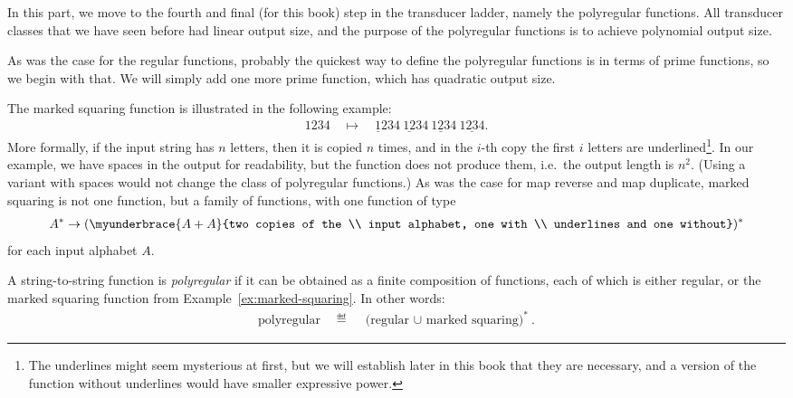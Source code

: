 In this part, we move to the fourth and final (for this book) step in the transducer ladder, namely the  polyregular functions. All transducer classes that we have seen before had linear output size, and the purpose of the polyregular functions is to achieve polynomial output size. 

As was the case for the regular functions, probably the quickest way to define the polyregular functions is in terms of prime functions, so we begin with that. We will simply add one more prime function, which has quadratic output size. 

\begin{myexample}\label{ex:marked-squaring}
    The marked squaring function is illustrated in the following example: 
    \begin{align*}
    1234 \quad \mapsto \quad \underline 1234 \ \underline{12} 34\  \underline{123} 4\  \underline{1234}.
    \end{align*}
    More formally, if the input  string has $n$ letters, then it is copied $n$ times, and in the $i$-th copy the  first $i$ letters are  underlined\footnote{The underlines might seem mysterious at first, but we will establish later in this book that they are necessary, and a version of the function without underlines would have smaller expressive power.}. In our example, we have spaces in the output for readability, but the function does not produce them, i.e.~the output length is $n^2$. (Using a variant with spaces would not change the class of polyregular functions.) As was the case for map reverse and map duplicate, marked squaring is not one function, but a family of functions, with one function of type 
    \begin{align*}
    A^* \to (\myunderbrace{A+A}{two copies of the \\ input alphabet, one with \\ underlines and one without})^*
    \end{align*}
    for each input alphabet $A$.
\end{myexample}


\begin{definition}
    \label{def:polyregular-functions}
    A string-to-string function is  \emph{polyregular} if it can be obtained as a finite composition of functions, each of which is either regular, or the marked squaring function from Example~\ref{ex:marked-squaring}. In other words: 
    \begin{align*}
    \text{polyregular} \quad \eqdef \quad \text{(regular $\cup$ marked squaring)}^*.
    \end{align*}
\end{definition}

